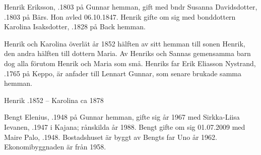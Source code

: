 Henrik Eriksson, .1803 på Gunnar hemman, gift med bndr Susanna Davidsdotter, .1803 på Bärs. Hon avled 06.10.1847. Henrik gifte om sig med bonddottern Karolina Isaksdotter, .1828 på Back hemman.

\begin{jhchildren}
  \item {}
  \item {}
  \item {}
  \item {}
  \item {}
  \item {}
  \item {}
  \item {}
  \item {}
\end{jhchildren}

Henrik och Karolina överlät år 1852 hälften av sitt hemman till sonen Henrik, den andra hälften till dottern Maria. Av Henriks och Sannas gemensamma barn dog alla förutom Henrik och Maria som små. Henriks far Erik Eliasson Nystrand, .1765 på Keppo, är anfader till Lennart Gunnar, som senare brukade samma hemman.

Henrik .1852  --  Karolina \textdied ca 1878







Bengt Elenius, .1948 på Gunnar hemman, gifte sig år 1967 med Sirkka-Liisa Ievanen, .1947 i Kajana; rånskilda år 1988. Bengt gifte om sig 01.07.2009 med Maire Palo, .1948. Bostadshuset är byggt av Bengts far Uno år 1962. Ekonomibyggnaden är från 1958.

\begin{jhchildren}
  \item {}
  \item {}
  \item {}
\end{jhchildren}

